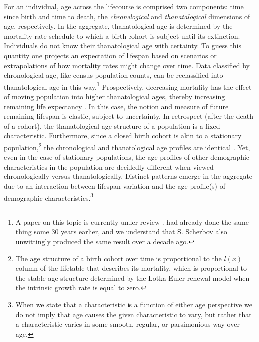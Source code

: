\documentclass{article}
\begin{document}
For an
individual, age across the lifecourse is comprised two components: time since
birth and time to death, the \textit{chronological} and \textit{thanatalogical}
dimensions of age, respectively. In the aggregate, thanatological age is determined
by the mortality rate schedule to which a birth cohort is subject until its
extinction. Individuals do not know their thanatological age with certainty. To
guess this quantity one projects an expectation of lifespan based on scenarios
or extrapolations of how mortality rates might change over time. Data classified by chronological age, like census population counts, can be
reclassified into thanatological age in this way.\footnote{A paper on this topic
is currently under review \citep{riffe2014paaposter}. \citet{brouard1986structure, brouard1989mouvements} had already done the same thing some 30 years earlier, and we understand that
S. Scherbov also unwittingly produced the same result over a decade ago.}
Prospectively, decreasing mortality has the effect of moving population into higher thanatological ages, thereby increasing
remaining life expectancy \citep{sanderson2005average}. In this case,
the notion and measure of future remaining lifespan is elastic, subject to uncertainty.
In retrospect (after the death of a cohort), the thanatological age structure of
a population is a fixed characteristic. Furthermore, since a closed birth cohort
is akin to a stationary population,\footnote{The age structure of a birth cohort over time is proportional to the $l(x)$ column of the lifetable that describes its
mortality, which is proportional to the stable age structure determined by
the Lotka-Euler renewal model when the intrinsic growth rate is equal to zero.}
the chronological and thanatological age profiles are identical
\citep{brouard1989mouvements,vaupel2009life,rao2014generalization}. Yet, even in
the case of stationary populations, the age profiles of other demographic characteristics
in the population are decidedly different when viewed chronologically versus
thanatologically. Distinct patterns emerge in the aggregate due to an interaction between lifespan variation and the age profile(s) of
demographic characteristics.\footnote{When we state that a characteristic is a
function of either age perspective we do not imply that age causes the given
characteristic to vary, but rather that a characteristic varies in some smooth, regular, or parsimonious
way over age.}
\end{document}
